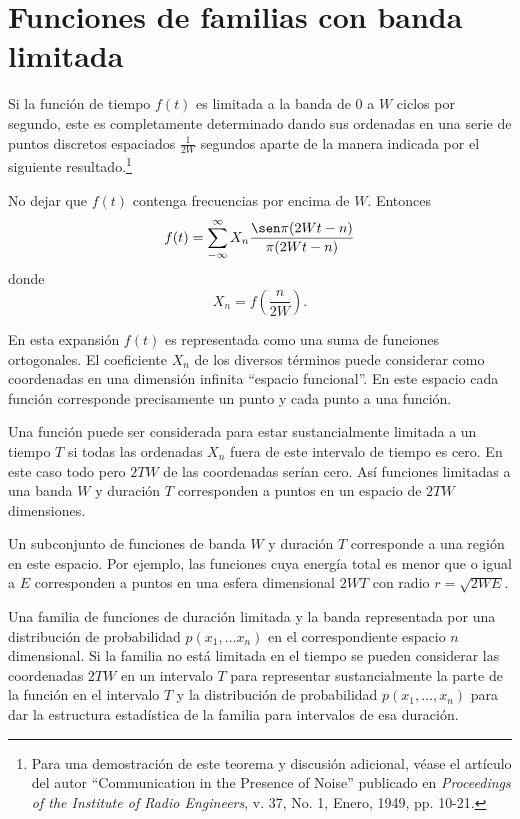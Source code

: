 \clearpage

\section{Funciones de familias con banda limitada}

Si la funci\'on de tiempo $f(t)$ es limitada a la banda de 0 a $W$
ciclos por segundo, este es completamente determinado dando sus
ordenadas en una serie de puntos discretos espaciados $\frac{1}{2W}$
segundos aparte de la manera indicada por el siguiente
resultado.\footnote[5]{Para una demostraci\'on de este teorema y
discusi\'on adicional, v\'ease el art\'iculo del autor ``Communication
in the Presence of Noise'' publicado en {\em Proceedings of the
Institute of Radio Engineers}, v. 37, No. 1, Enero, 1949, pp. 10-21.}

\begin{theorem}
  No dejar que $f(t)$ contenga frecuencias por encima de $W$. Entonces
  \begin{equation}
    f(t) = \sum_{-\infty}^{\infty} X_n \frac{\sen \pi(2Wt-n)}{\pi(2Wt-n)}
  \end{equation}
  donde
  \begin{equation}
    X_n = f\left(\frac{n}{2W} \right).
  \end{equation}
\end{theorem}

En esta expansi\'on $f(t)$ es representada como una suma de funciones
ortogonales. El coeficiente $X_n$ de los diversos t\'erminos puede
considerar como coordenadas en una dimensi\'on infinita ``espacio
funcional''. En este espacio cada funci\'on corresponde precisamente
un punto y cada punto a una funci\'on.

Una funci\'on puede ser considerada para estar sustancialmente
limitada a un tiempo $T$ si todas las ordenadas $X_n$ fuera de este
intervalo de tiempo es cero. En este caso todo pero $2TW$ de las
coordenadas ser\'ian cero. As\'i funciones limitadas a una banda $W$ y
duraci\'on $T$ corresponden a puntos en un espacio de $2TW$
dimensiones.

Un subconjunto de funciones de banda $W$ y duraci\'on $T$ corresponde
a una regi\'on en este espacio. Por ejemplo, las funciones cuya
energ\'ia total es menor que o igual a $E$ corresponden a puntos en
una esfera dimensional $2WT$ con radio $r=\sqrt{2WE}$.

Una familia de funciones de duraci\'on limitada y la banda
representada por una distribuci\'on de probabilidad $p(x_1, \ldots
x_n)$ en el correspondiente espacio $n$ dimensional. Si la familia no
est\'a limitada en el tiempo se pueden considerar las coordenadas
$2TW$ en un intervalo $T$ para representar sustancialmente la parte de
la funci\'on en el intervalo $T$ y la distribuci\'on de probabilidad
$p(x_1, \ldots, x_n)$ para dar la estructura estad\'istica de la familia
para intervalos de esa duraci\'on.

